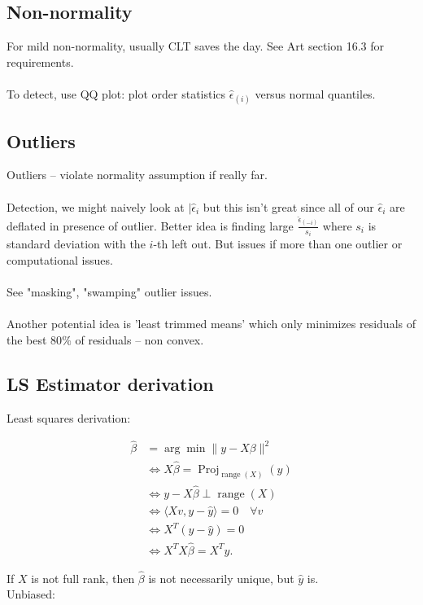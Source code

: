 \documentclass{article}
\begin{document}
\subsection{Non-normality}
For mild non-normality, usually CLT saves the day. See Art section 16.3 for requirements.\\\\
To detect, use QQ plot: plot order statistics $\hat \epsilon_{(i)}$ versus normal quantiles. 
\subsection{Outliers}
Outliers -- violate normality assumption if really far. 	\\ \\

Detection, we might naively look at $|\hat \epsilon_i$ but this isn't great since all of our $\hat \epsilon_i$ are deflated in presence of outlier. Better idea is finding large $\frac{\hat \epsilon_{(-i)}}{s_i}$ where $s_i$ is standard deviation with the $i$-th left out. But issues if more than one outlier or computational issues. \\ \\ 
See "masking", "swamping" outlier issues.\\ \\ 

Another potential idea is 'least trimmed means' which only minimizes residuals of the best 80$\%$ of residuals -- non convex. 

\subsection{LS Estimator derivation}
Least squares derivation:

\begin{align}
    \hat \beta &= \arg \min \|y - X\beta \|^2  \\
    & \iff X\hat \beta = \operatorname{Proj}_{\operatorname{range}(X)}(y)\\
    & \iff y - X \hat \beta \perp \operatorname{range}(X)\\
    &\iff \langle Xv, y - \hat y\rangle =0 \quad \forall v\\
    & \iff X^T (y-\hat y) = 0\\
    & \iff X^TX \hat \beta = X^T y.
\end{align}

If $X$ is not full rank, then $\hat \beta$ is not necessarily unique, but $\hat y$ is. \\
Unbiased:
\end{document}
